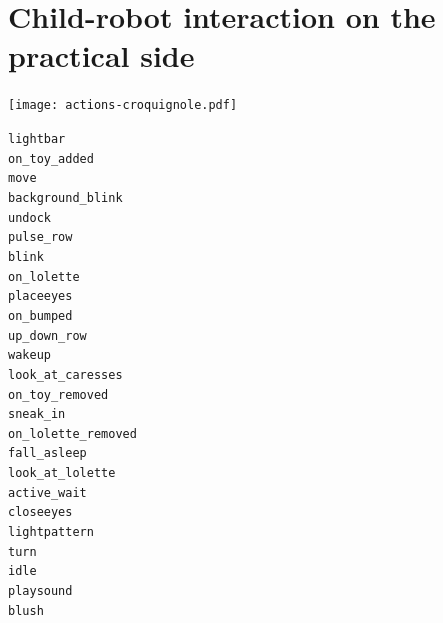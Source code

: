 \documentclass[compress]{beamer}
\begin{document}


\section{Child-robot interaction on the practical side}


{
\begin{frame}{}
    \centering
    \texttt{[image: actions-croquignole.pdf]}

    \begin{multicols}{3}
\scriptsize
{\tt lightbar} \\
{\tt on\_toy\_added} \\
{\tt move} \\
{\tt background\_blink} \\
{\tt undock} \\
{\tt pulse\_row} \\
{\tt blink} \\
{\tt on\_lolette} \\
{\tt placeeyes} \\
{\tt on\_bumped} \\
{\tt up\_down\_row} \\
{\tt wakeup} \\
{\tt look\_at\_caresses} \\
{\tt on\_toy\_removed} \\
{\tt sneak\_in} \\
{\tt on\_lolette\_removed} \\
{\tt fall\_asleep} \\
{\tt look\_at\_lolette} \\
{\tt active\_wait} \\
{\tt closeeyes} \\
{\tt lightpattern} \\
{\tt turn} \\
{\tt idle} \\
{\tt playsound} \\
{\tt blush}

    \end{multicols}
\end{frame}
}
\end{document}
